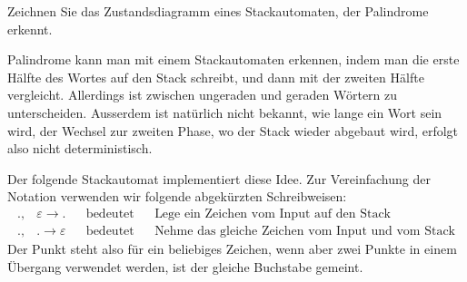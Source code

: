 Zeichnen Sie das Zustandsdiagramm eines Stackautomaten, der
Palindrome erkennt.


\begin{loesung}
Palindrome kann man mit einem Stackautomaten erkennen, indem man 
die erste Hälfte des Wortes auf den Stack schreibt, und dann mit
der zweiten Hälfte vergleicht. Allerdings ist zwischen ungeraden
und geraden Wörtern zu unterscheiden. Ausserdem ist natürlich
nicht bekannt, wie lange ein Wort sein wird, der Wechsel zur zweiten
Phase, wo der Stack wieder abgebaut wird, erfolgt also nicht deterministisch.

Der folgende Stackautomat implementiert diese Idee. Zur Vereinfachung der
Notation verwenden wir folgende abgekürzten Schreibweisen:
\begin{align*}
.,&\varepsilon\to.&&\text{bedeutet}&&\text{Lege ein Zeichen vom Input auf den Stack}
\\
.,&.\to\varepsilon&&\text{bedeutet}&&\text{Nehme das gleiche Zeichen vom Input und vom Stack}
\end{align*}
Der Punkt steht also für ein beliebiges Zeichen, wenn aber zwei Punkte in einem
Übergang verwendet werden, ist der gleiche Buchstabe gemeint.
\begin{center}
\end{center}
\end{loesung}
